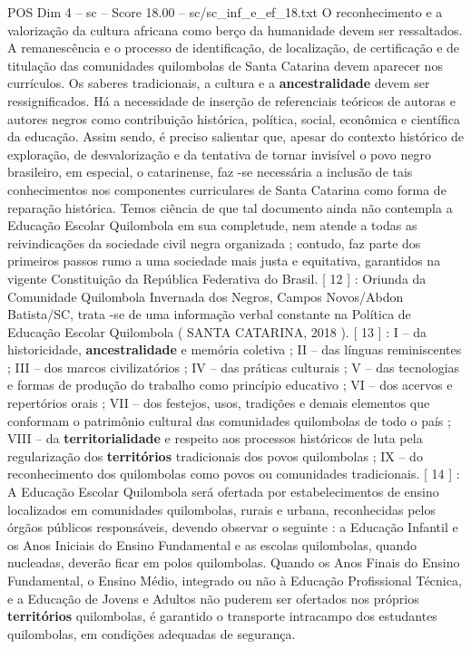 \begin{textsample}{POS Dim 4 – sc – Score 18.00 – sc/sc\_inf\_e\_ef\_18.txt}
O reconhecimento e a valorização da cultura africana como berço da humanidade devem ser ressaltados.
A remanescência e o processo de identificação, de localização, de certificação e de titulação das comunidades quilombolas de Santa Catarina devem aparecer nos currículos.
Os saberes tradicionais, a cultura e a \textbf{ancestralidade} devem ser ressignificados.
Há a necessidade de inserção de referenciais teóricos de autoras e autores negros como contribuição histórica, política, social, econômica e científica da educação.
Assim sendo, é preciso salientar que, apesar do contexto histórico de exploração, de desvalorização e da tentativa de tornar invisível o povo negro brasileiro, em especial, o catarinense, faz -se necessária a inclusão de tais conhecimentos nos componentes curriculares de Santa Catarina como forma de reparação histórica.
Temos ciência de que tal documento ainda não contempla a Educação Escolar Quilombola em sua completude, nem atende a todas as reivindicações da sociedade civil negra organizada ; contudo, faz parte dos primeiros passos rumo a uma sociedade mais justa e equitativa, garantidos na vigente Constituição da República Federativa do Brasil. [ 12 ] : Oriunda da Comunidade Quilombola Invernada dos Negros, Campos Novos/Abdon Batista/SC, trata -se de uma informação verbal constante na Política de Educação Escolar Quilombola ( SANTA CATARINA, 2018 ). [ 13 ] : I – da historicidade, \textbf{ancestralidade} e memória coletiva ; II – das línguas reminiscentes ; III – dos marcos civilizatórios ; IV – das práticas culturais ; V – das tecnologias e formas de produção do trabalho como princípio educativo ; VI – dos acervos e repertórios orais ; VII – dos festejos, usos, tradições e demais elementos que conformam o patrimônio cultural das comunidades quilombolas de todo o país ; VIII – da \textbf{territorialidade} e respeito aos processos históricos de luta pela regularização dos \textbf{territórios} tradicionais dos povos quilombolas ; IX – do reconhecimento dos quilombolas como povos ou comunidades tradicionais. [ 14 ] : A Educação Escolar Quilombola será ofertada por estabelecimentos de ensino localizados em comunidades quilombolas, rurais e urbana, reconhecidas pelos órgãos públicos responsáveis, devendo observar o seguinte : a Educação Infantil e os Anos Iniciais do Ensino Fundamental e as escolas quilombolas, quando nucleadas, deverão ficar em polos quilombolas.
Quando os Anos Finais do Ensino Fundamental, o Ensino Médio, integrado ou não à Educação Profissional Técnica, e a Educação de Jovens e Adultos não puderem ser ofertados nos próprios \textbf{territórios} quilombolas, é garantido o transporte intracampo dos estudantes quilombolas, em condições adequadas de segurança.

\end{textsample}
